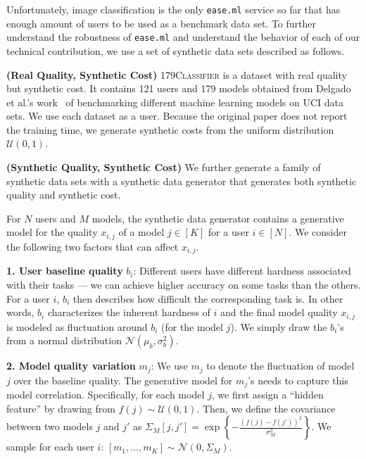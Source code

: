 \documentclass[letterpaper]{vldb}
\newcommand{\eml}{\texttt{ease.ml}\xspace}
\begin{document}
\vspace{0.5em}
Unfortunately, image classification 
is the only \eml service so far that
has enough amount of users
to be used as a benchmark data set.
To further understand the robustness
of \eml and understand the
behavior of each of our technical
contribution, we use a set
of synthetic data sets described
as follows.

\vspace{0.5em}
\noindent
{\bf (Real Quality, Synthetic Cost)} 
\textsc{179Classifier}
is a dataset with real quality 
but synthetic cost. It contains
121 users and 179 models obtained from
Delgado et al.'s work~\cite{DelgadoCBA14}
of benchmarking different machine
learning models on UCI data sets.
We use each dataset as a user.
Because the original paper does not
report the training time, we 
generate synthetic costs from the uniform distribution $\mathcal{U}(0, 1)$.

\vspace{0.5em}
\noindent
{\bf (Synthetic Quality, Synthetic Cost)}
We further generate a family of 
synthetic data sets with a 
synthetic data generator that generates
both synthetic quality and synthetic cost.

For $N$ users and $M$ models, the synthetic
data generator contains a generative model 
for the quality $x_{i,j}$ of a 
model $j\in[K]$ for a user $i\in[N]$.
We consider the following two factors that can affect $x_{i,j}$.

\noindent
{\bf 1. User baseline quality} $b_i$: Different 
users have different hardness associated with their tasks --- we can achieve higher accuracy on some tasks than the others.
For a user $i$, $b_i$ then describes how difficult the corresponding task is.
In other words, $b_i$ characterizes the inherent hardness of $i$ and the final model quality $x_{i,j}$ is modeled as fluctuation around $b_i$ (for the model $j$). We simply draw the $b_i$'s from a normal distribution $\mathcal{N}(\mu_b,\sigma_b^2)$.


\noindent
{\bf 2. Model quality variation} $m_j$: 
We use $m_j$ to denote the fluctuation of model $j$
over the baseline quality. The generative model for 
$m_j$'s needs to capture this model correlation.
Specifically, for each model $j$, we first assign a 
``hidden feature'' by drawing
from $f(j)\sim\mathcal{U}(0,1)$.
Then, we define the covariance between 
two models $j$ and $j'$ as 
$\Sigma_M[j, j']=\exp \left\{-\frac{(f(j) - f(j'))^2}{\sigma_M^2} \right\}$. We sample
for each user $i$: $
[m_1,...,m_K] \sim \mathcal{N}(0, \Sigma_M)$.
\end{document}

